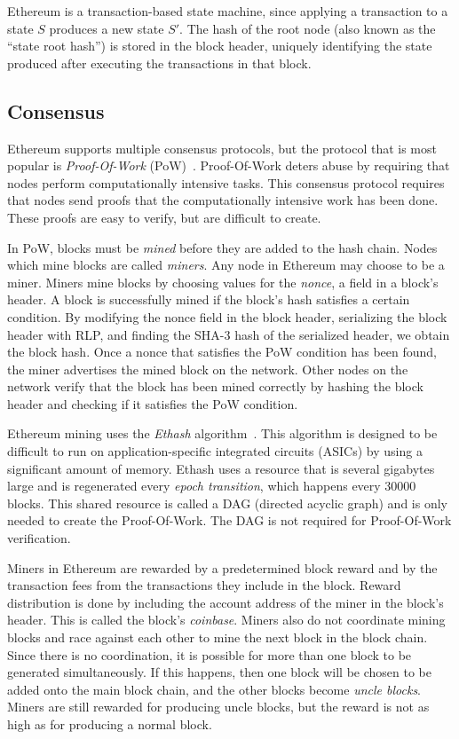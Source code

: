 \documentclass[12pt]{article}
\newcounter{protocol}
\begin{document}
Ethereum is a transaction-based state machine, since applying a transaction to a state $S$ produces a new state $S'$. The hash of the root node (also known as the ``state root hash'') is stored in the block header, uniquely identifying the state produced after executing the transactions in that block.


\subsection{Consensus} \label{subsection:consensus}
Ethereum supports multiple consensus protocols, but the protocol that is most popular is \emph{Proof-Of-Work} (PoW)~\cite{bitcoin-whitepaper}. Proof-Of-Work deters abuse by requiring that nodes perform computationally intensive tasks. This consensus protocol requires that nodes send proofs that the computationally intensive work has been done. These proofs are easy to verify, but are difficult to create.

In PoW, blocks must be \emph{mined} before they are added to the hash chain. Nodes which mine blocks are called \emph{miners}. Any node in Ethereum may choose to be a miner.
Miners mine blocks by choosing values for the \emph{nonce}, a field in a block's header. A block is successfully mined if the block's hash satisfies a certain condition. By modifying the nonce field in the block header, serializing the block header with RLP, and finding the SHA-3 hash of the serialized header, we obtain the block hash. Once a nonce that satisfies the PoW condition has been found, the miner advertises the mined block on the network. Other nodes on the network verify that the block has been mined correctly by hashing the block header and checking if it satisfies the PoW condition.

Ethereum mining uses the \emph{Ethash} algorithm~\cite{ethash}. This algorithm is designed to be difficult to run on application-specific integrated circuits (ASICs) by using a significant amount of memory. Ethash uses a resource that is several gigabytes large and is regenerated every \emph{epoch transition}, which happens every 30000 blocks. This shared resource is called a DAG (directed acyclic graph) and is only needed to create the Proof-Of-Work. The DAG is not required for Proof-Of-Work verification.

Miners in Ethereum are rewarded by a predetermined block reward and by the transaction fees from the transactions they include in the block. Reward distribution is done by including the account address of the miner in the block's header. This is called the block's \emph{coinbase}. Miners also do not coordinate mining blocks and race against each other to mine the next block in the block chain. Since there is no coordination, it is possible for more than one block to be generated simultaneously. If this happens, then one block will be chosen to be added onto the main block chain, and the other blocks become \emph{uncle blocks}. Miners are still rewarded for producing uncle blocks, but the reward is not as high as for producing a normal block.
\end{document}
